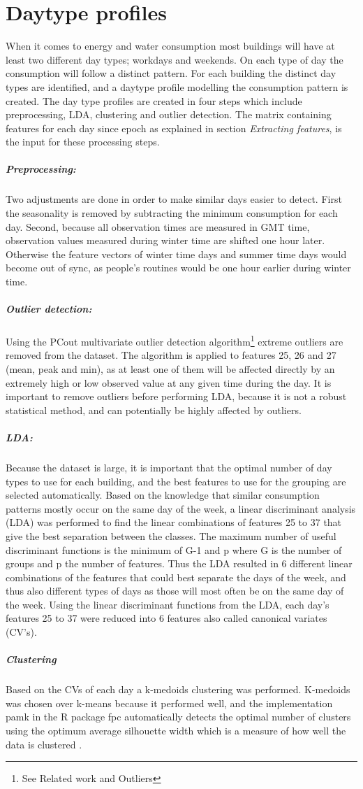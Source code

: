\section*{Daytype profiles}
When it comes to energy and water consumption most buildings will have at least two different day types; workdays and weekends. On each type of day the consumption will follow a distinct pattern. For each building the distinct day types are identified, and a daytype profile modelling the consumption pattern is created. The day type profiles are created in four steps which include preprocessing, LDA, clustering and outlier detection. The matrix containing features for each day since epoch as explained in section \emph{Extracting features}, is the input for these processing steps.
\subparagraph{Preprocessing:}Two adjustments are done in order to make similar days easier to detect. First the seasonality is removed by subtracting the minimum consumption for each day. Second, because all observation times are measured in GMT time, observation values measured during winter time are shifted one hour later. Otherwise the feature vectors of winter time days and summer time days would become out of sync, as people's routines would be one hour earlier during winter time. 
\subparagraph{Outlier detection:}Using the PCout multivariate outlier detection algorithm\footnote{See Related work and Outliers}  extreme outliers are removed from the dataset. The algorithm is applied to features 25, 26 and 27 (mean, peak and min), as at least one of them will be affected directly by an extremely high or low observed value at any given time during the day. It is important to remove outliers before performing LDA, because it is not a robust statistical method, and can potentially be highly affected by outliers.
\subparagraph{LDA:}Because the dataset is large, it is important that the optimal number of day types to use for each building, and the best features to use for the grouping are selected automatically. Based on the knowledge that similar consumption patterns mostly occur on the same day of the week, a linear discriminant analysis (LDA) was performed to find the linear combinations of features 25 to 37 that give the best separation between the classes. The maximum number of useful discriminant functions is the minimum of G-1 and p where G is the number of groups and p the number of features. Thus the LDA resulted in 6 different linear combinations of the features that could best separate the days of the week, and thus also different types of days as those will most often be on the same day of the week. Using the linear discriminant functions from the LDA, each day’s features 25 to 37 were reduced into 6 features also called canonical variates (CV’s).
\subparagraph{Clustering}Based on the CVs of each day a k-medoids clustering was performed. K-medoids was chosen over k-means because it performed well, and the implementation pamk in the R package fpc automatically detects the optimal number of clusters using the optimum average silhouette width which is a measure of how well the data is clustered \cite{PeterJRousseeuw}. 


